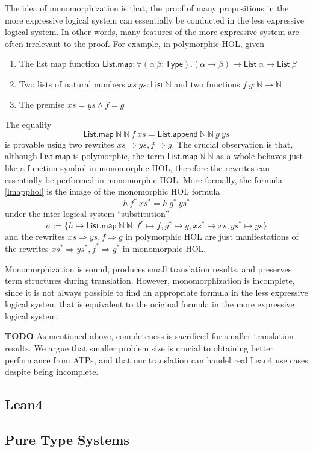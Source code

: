   The idea of monomorphization is that, the proof of many propositions in the more expressive logical
  system can essentially be conducted in the less expressive logical system. In other words,
  many features of the more expressive system are often irrelevant to the proof. For example,
  in polymorphic HOL, given
  \begin{enumerate}
    \item The list map function $\mathsf{List.map} : \forall (\alpha \ \beta : \mathsf{Type}). (\alpha \to \beta) \to \mathsf{List} \ \alpha \to \mathsf{List} \ \beta$
    \item Two lists of natural numbers $xs \ ys : \mathsf{List} \ \mathbb{N}$ and two functions $f \ g : \mathbb{N} \to \mathbb{N}$
    \item The premise $xs = ys \land f = g$
  \end{enumerate}
  The equality
  \begin{equation}\label{lmapphol}
    \mathsf{List.map} \ \mathbb{N} \ \mathbb{N} \ f \ xs = \mathsf{List.append} \ \mathbb{N} \ \mathbb{N} \ g \ ys
  \end{equation}
  is provable using two rewrites $xs \Rightarrow ys, f \Rightarrow g$. The crucial observation is that, although $\textsf{List.map}$ is polymorphic, the term
  $\mathsf{List.map} \ \mathbb{N} \ \mathbb{N}$ as a whole behaves just like a function symbol in monomorphic HOL,
  therefore the rewrites can essentially be performed in monomorphic HOL. More formally,
  the formula \eqref{lmapphol} is the image of the monomorphic HOL formula
  $$h \ f^* \ xs^* = h \ g^* \ ys^*$$
  under the inter-logical-system ``substitution''
  $$\sigma := \{h \mapsto \mathsf{List.map} \ \mathbb{N} \ \mathbb{N},
    f^* \mapsto f, g^* \mapsto g, xs^* \mapsto xs, ys^* \mapsto ys\}$$
  and the rewrites $xs \Rightarrow ys, f \Rightarrow g$ in polymorphic HOL are just manifestations of the
  rewrites $xs^* \Rightarrow ys^*, f^* \Rightarrow g^*$ in monomorphic HOL.
  
  Monomorphization is sound, produces small translation results, and preserves
  term structures during translation. However, monomorphization is incomplete,
  since it is not always possible to find an appropriate formula in the less
  expressive logical system that is equivalent to the original formula
  in the more expressive logical system.

  \textbf{TODO} As mentioned above, completeness is sacrificed for smaller translation
  results. We argue that smaller problem size is crucial to obtaining better performance
  from ATPs, and that our translation can handel real Lean4 use cases despite being incomplete.

\subsection{Lean4}

\subsection{Pure Type Systems}